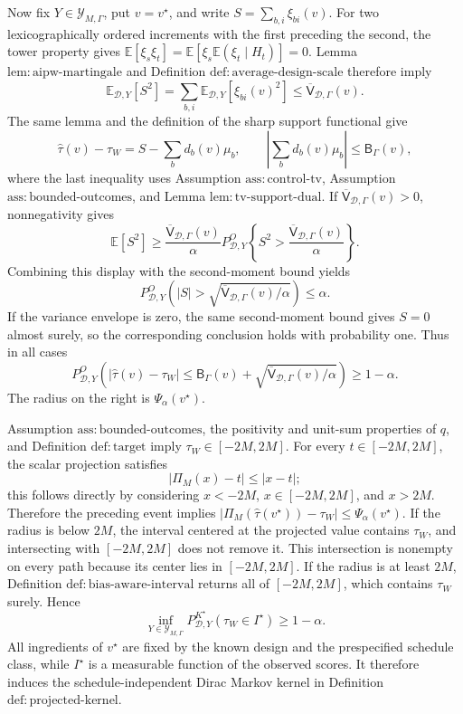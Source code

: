 Now fix \(Y\in\mathcal Y_{M,\Gamma}\), put \(v=v^\star\), and write \(S=\sum_{b,i}\xi_{bi}(v)\).  For two lexicographically ordered increments with the first preceding the second, the tower property gives \(\mathbb E[\xi_s\xi_t]=\mathbb E[\xi_s\mathbb E(\xi_t\mid H_t)]=0\).  Lemma \(\mathrm{lem:aipw\text{-}martingale}\) and Definition \(\mathrm{def:average\text{-}design\text{-}scale}\) therefore imply
\[
\mathbb E_{\mathcal D,Y}[S^2]
=\sum_{b,i}\mathbb E_{\mathcal D,Y}[\xi_{bi}(v)^2]
\le\overline{\mathsf V}_{\mathcal D,\Gamma}(v).
\]
The same lemma and the definition of the sharp support functional give
\[
\widehat\tau(v)-\tau_W
=S-\sum_bd_b(v)\mu_b,
\qquad
\left|\sum_bd_b(v)\mu_b\right|\le\mathsf B_\Gamma(v),
\]
where the last inequality uses Assumption \(\mathrm{ass:control\text{-}tv}\), Assumption \(\mathrm{ass:bounded\text{-}outcomes}\), and Lemma \(\mathrm{lem:tv\text{-}support\text{-}dual}\).  If \(\overline{\mathsf V}_{\mathcal D,\Gamma}(v)>0\), nonnegativity gives
\[
\mathbb E[S^2]\ge
\frac{\overline{\mathsf V}_{\mathcal D,\Gamma}(v)}{\alpha}
P^O_{\mathcal D,Y}\left\{
S^2>\frac{\overline{\mathsf V}_{\mathcal D,\Gamma}(v)}{\alpha}
\right\}.
\]
Combining this display with the second-moment bound yields
\[
P^O_{\mathcal D,Y}\left(
 |S|>\sqrt{\overline{\mathsf V}_{\mathcal D,\Gamma}(v)/\alpha}
\right)\le\alpha.
\]
If the variance envelope is zero, the same second-moment bound gives \(S=0\) almost surely, so the corresponding conclusion holds with probability one.  Thus in all cases
\[
P^O_{\mathcal D,Y}\left(
 |\widehat\tau(v)-\tau_W|\le
 \mathsf B_\Gamma(v)+
 \sqrt{\overline{\mathsf V}_{\mathcal D,\Gamma}(v)/\alpha}
\right)\ge1-\alpha.
\]
The radius on the right is \(\Psi_\alpha(v^\star)\).

Assumption \(\mathrm{ass:bounded\text{-}outcomes}\), the positivity and unit-sum properties of \(q\), and Definition \(\mathrm{def:target}\) imply \(\tau_W\in[-2M,2M]\).  For every \(t\in[-2M,2M]\), the scalar projection satisfies
\[
|\Pi_M(x)-t|\le|x-t|;
\]
this follows directly by considering \(x<-2M\), \(x\in[-2M,2M]\), and \(x>2M\).  Therefore the preceding event implies
\(|\Pi_M(\widehat\tau(v^\star))-\tau_W|\le\Psi_\alpha(v^\star)\).  If the radius is below \(2M\), the interval centered at the projected value contains \(\tau_W\), and intersecting with \([-2M,2M]\) does not remove it.  This intersection is nonempty on every path because its center lies in \([-2M,2M]\).  If the radius is at least \(2M\), Definition \(\mathrm{def:bias\text{-}aware\text{-}interval}\) returns all of \([-2M,2M]\), which contains \(\tau_W\) surely.  Hence
\[
\inf_{Y\in\mathcal Y_{M,\Gamma}}
P^{K^\star}_{\mathcal D,Y}(\tau_W\in I^\star)\ge1-\alpha.
\]
All ingredients of \(v^\star\) are fixed by the known design and the prespecified schedule class, while \(I^\star\) is a measurable function of the observed scores.  It therefore induces the schedule-independent Dirac Markov kernel in Definition \(\mathrm{def:projected\text{-}kernel}\).

